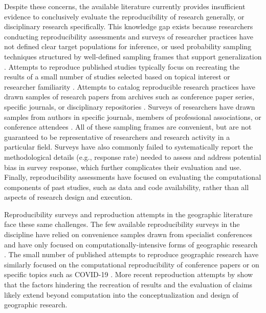 \documentclass[]{interact}
\theoremstyle{plain}%
\theoremstyle{definition}
\theoremstyle{remark}
\begin{document}
Despite these concerns, the available literature currently provides insufficient evidence to conclusively evaluate the reproducibility of research generally, or disciplinary research specifically.
This knowledge gap exists because researchers conducting reproducibility assessments and surveys of researcher practices have not defined clear target populations for inference, or used probability sampling techniques structured by well-defined sampling frames that support generalization \citep{NASEM2019}.
Attempts to reproduce published studies typically focus on recreating the results of a small number of studies selected based on topical interest or researcher familiarity \citep{camerer2016evaluating, camerer2018evaluating, open2015estimating}. 
Attempts to catalog reproducible research practices have drawn samples of research papers from archives such as conference paper series, specific journals, or disciplinary repositories \citep{byrne_2017, gundersen2018state, stodden2016enhancing, stodden2018enabling}.
Surveys of researchers have drawn samples from authors in specific journals, members of professional associations, or conference attendees \citep{baker20161}.
All of these sampling frames are convenient, but are not guaranteed to be representative of researchers and research activity in a particular field. 
Surveys have also commonly failed to systematically report the methodological details (e.g., response rate) needed to assess and address potential bias in survey response, which further complicates their evaluation and use. 
Finally, reproducibility assessments have focused on evaluating the computational components of past studies, such as data and code availability, rather than all aspects of research design and execution.

Reproducibility surveys and reproduction attempts in the geographic literature face these same challenges. 
The few available reproducibility surveys in the discipline have relied on convenience samples drawn from specialist conferences and have only focused on computationally-intensive forms of geographic research \citep{balz2020reproducibility, konkol2019, ostermann2017}. 
The small number of published attempts to reproduce geographic research have similarly focused on the computational reproducibility of conference papers \citep{Nust-AGILE_2018, Nust_AGILE_2020, Nust_AGILE_2021, Nust_AGILE_2022, ostermann2021} or on specific topics such as COVID-19 \citep{Holler2023disability, Kedron2022dimaggio, Kedron2023Beyond, paez2022reproducibility}. 
More recent reproduction attempts by \citet{Kedron2023Beyond} show that the factors hindering the recreation of results and the evaluation of claims likely extend beyond computation into the conceptualization and design of geographic research.
\end{document}
